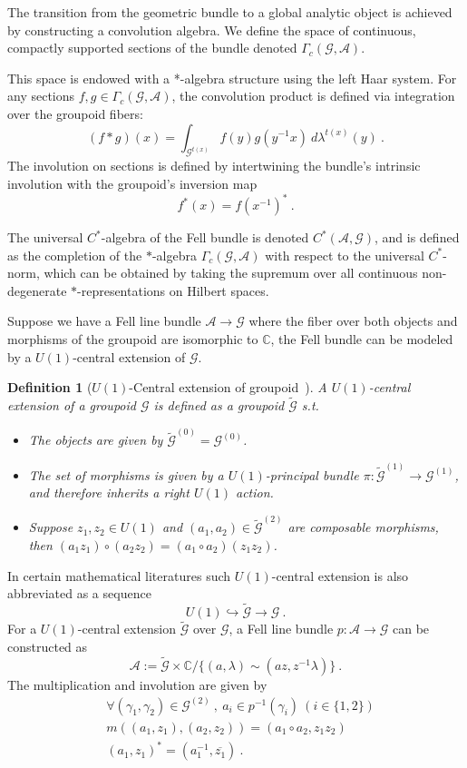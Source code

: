 \documentclass[a4paper,11pt]{article}
\newtheorem{defn}[lemma]{Definition}
\newcommand{\be}{\begin{equation}}
\newcommand{\ee}{\end{equation}}
\newcommand{\ba}{\begin{aligned}}
\newcommand{\ea}{\end{aligned}}
\def\bbC{\mathbb{C}}
\def\CA{\mathcal{A}}
\def\CG{\mathcal{G}}
\begin{document}
The transition from the geometric bundle to a global analytic object is achieved by constructing a convolution algebra. We define the space of continuous, compactly supported sections of the bundle denoted $\Gamma_c(\mathcal{G}, \mathcal{A})$.

This space is endowed with a *-algebra structure using the left Haar system. For any sections $f, g \in \Gamma_c(\mathcal{G}, \mathcal{A})$, the convolution product is defined via integration over the groupoid fibers:
\be (f * g)(x) = \int_{\mathcal{G}^{t(x)}} f(y)g(y^{-1}x) \ d\lambda^{t(x)}(y) \ .\ee
The involution on sections is defined by intertwining the bundle's intrinsic involution with the groupoid's inversion map
\be f^*(x) = f(x^{-1})^*\ . \ee

The universal $C^*$-algebra of the Fell bundle is denoted $C^*(\mathcal{A}, \mathcal{G})$, and is defined as the completion of the $*$-algebra $\Gamma_c(\mathcal{G}, \mathcal{A})$ with respect to the universal $C^*$-norm, which can be obtained by taking the supremum over all continuous non-degenerate $*$-representations on Hilbert spaces.

Suppose we have a Fell line bundle $\CA\to \CG$ where the fiber over both objects and morphisms of the groupoid are isomorphic to $\bbC$, the Fell bundle can be modeled by a $U(1)$-central extension of $\CG$. 
\begin{defn}[$U(1)$-Central extension of groupoid~\cite{suzuki:2018cle}]\label{def:centextu1}
    A $U(1)$-central extension of a groupoid $\CG$ is defined as a groupoid $\widetilde{\CG}$ s.t.
    \begin{itemize}
        \item The objects are given by $\widetilde{\CG}^{(0)} =\CG^{(0)}$.
        \item The set of morphisms is given by a $U(1)$-principal bundle $\pi: \widetilde{\CG}^{(1)} \to  \CG^{(1)}$, and therefore inherits a right $U(1)$ action.
        \item Suppose $z_1,z_2\in U(1)$ and $(a_1,a_2)\in \widetilde{\CG}^{(2)}$ are composable morphisms, then $(a_1z_1) \circ (a_2z_2) = (a_1\circ a_2)(z_1z_2)$.
    \end{itemize}
\end{defn}
In certain mathematical literatures such $U(1)$-central extension is also abbreviated as a sequence~\cite{Suzuki:2002hrm}
\be
  U(1) \stackrel{}{\hookrightarrow} \widetilde{\CG} \stackrel{}{\longrightarrow} \CG  \ .
\ee
For a $U(1)$-central extension $\widetilde{\CG}$ over $\CG$, a Fell line bundle $p:\CA\to \CG$ can be constructed as
\be  \CA := \widetilde{\CG} \times \bbC  / \{ (a ,\lambda)\sim (az,z^{-1}\lambda)  \} \ . \ee
The multiplication and involution are given by
\be \ba &\forall (\gamma_1,\gamma_2)\in \CG^{(2)} \ , \ a_i\in p^{-1}(\gamma_i) \ (i\in \{ 1,2\} ) \\
&m((a_1,z_1) , (a_2,z_2)) = (a_1\circ a_2 , z_1z_2) \\
&(a_1,z_1)^* = (a_1^{-1},\overline{z_1}) \ .
\ea\ee
\end{document}
